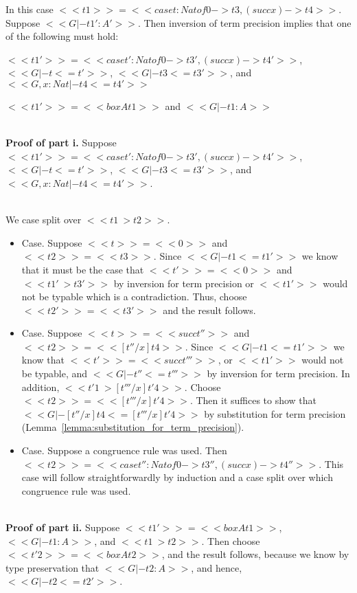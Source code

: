 \begin{description}
  \noindent
  In this case $<<t1>> = <<case t : Nat of 0 -> t3, (succ x) -> t4>>$.  Suppose
  $<<G |- t1' : A'>>$. 
  Then inversion of term precision implies that one of the following must hold:
  \begin{enumR}
    \item $<<t1'>> = <<case t' : Nat of 0 -> t3', (succ x) -> t4'>>$, $<<G |- t <= t'>>$, $<<G |- t3 <= t3'>>$,
    and $<<G, x : Nat |- t4 <= t4'>>$
  \item $<<t1'>> = <<box A t1>>$ and $<<G |- t1 : A>>$
  \end{enumR}

  \ \\
  \noindent
  \textbf{Proof of part i.}  Suppose $<<t1'>> = <<case t' : Nat of 0 -> t3', (succ x) -> t4'>>$,
  $<<G |- t <= t'>>$, $<<G |- t3 <= t3'>>$, and $<<G, x : Nat |- t4 <= t4'>>$.

  \ \\
  \noindent
  We case split over $<<t1 ~> t2>>$.
  \begin{itemize}
  \item[] Case.  Suppose $<<t>> = <<0>>$ and $<<t2>> = <<t3>>$.  Since $<<G |- t1 <= t1'>>$ we know that
    it must be the case that $<<t'>> = <<0>>$ and $<<t1' ~> t3'>>$ by inversion for term precision
    or $<<t1'>>$ would not be typable which is a contradiction.  Thus, choose $<<t2'>> = <<t3'>>$ and the result follows.
    
  \item[] Case.  Suppose $<<t>> = <<succ t''>>$ and $<<t2>> = << [t''/x]t4>>$.  Since $<<G |- t1 <= t1'>>$
    we know that $<<t'>> = <<succ t'''>>$, or $<<t1'>>$ would not be typable,
    and $<<G |- t'' <= t'''>>$ by inversion for term precision. In addition,
    $<<t'1 ~> [t'''/x]t'4>>$. Choose $<<t2>> = << [t'''/x]t'4>>$.  Then it suffices to show that
    $<<G |- [t''/x]t4 <= [t'''/x]t'4>>$ by substitution for term precision (Lemma~\ref{lemma:substitution_for_term_precision}).    
    
  \item[] Case.  Suppose a congruence rule was used.  Then $<<t2>> = <<case t'' : Nat of 0 -> t3'', (succ x) -> t4''>>$.
    This case will follow straightforwardly by induction and a case split over which congruence rule was used.    
  \end{itemize}

  \ \\
  \noindent
  \textbf{Proof of part ii.}  Suppose $<<t1'>> = <<box A t1>>$, $<<G |- t1 : A>>$, and $<<t1 ~> t2>>$.
  Then choose $<<t'2>> = <<box A t2>>$, and the result follows, because we know by type preservation
  that $<<G |- t2 : A>>$, and hence, $<<G |- t2 <= t2'>>$.


\end{description}

